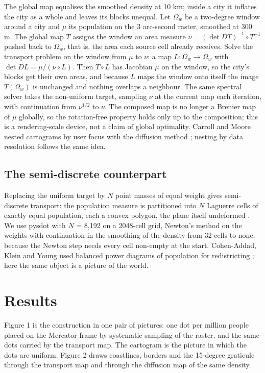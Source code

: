 The global map equalises the smoothed density at 10 km; inside a city it
inflates the city as a whole and leaves its blocks unequal. Let
\(\Omega_w\) be a two-degree window around a city and \(\mu\) its
population on the 3 arc-second raster, smoothed at 300 m. The global map
\(T\) assigns the window an area measure
\(\nu = (\det DT)^{-1}\circ T^{-1}\) pushed back to \(\Omega_w\), that
is, the area each source cell already receives. Solve the transport
problem on the window from \(\mu\) to \(\nu\): a map
\(L:\Omega_w\to\Omega_w\) with \(\det DL = \mu/(\nu\circ L)\). Then
\(T\circ L\) has Jacobian \(\mu\) on the window, so the city's blocks
get their own areas, and because \(L\) maps the window onto itself the
image \(T(\Omega_w)\) is unchanged and nothing overlaps a neighbour. The
same spectral solver takes the non-uniform target, sampling \(\nu\) at
the current map each iteration, with continuation from \(\nu^{1/2}\) to
\(\nu\). The composed map is no longer a Brenier map of \(\mu\)
globally, so the rotation-free property holds only up to the
composition; this is a rendering-scale device, not a claim of global
optimality. Carroll and Moore nested cartograms by user focus with the
diffusion method \citep{carroll2008}; nesting by data resolution follows the
same idea.

\subsection{The semi-discrete
counterpart}\label{the-semi-discrete-counterpart}

Replacing the uniform target by \(N\) point masses of equal weight gives
semi-discrete transport: the population measure is partitioned into
\(N\) Laguerre cells of exactly equal population, each a convex polygon,
the plane itself undeformed \citep{merigot2011}. We use pysdot \citep{pysdot}
with \(N\) = 8,192 on a 2048-cell grid, Newton's method on the weights
with continuation in the smoothing of the density from 32 cells to none,
because the Newton step needs every cell non-empty at the start.
Cohen-Addad, Klein and Young used balanced power diagrams of population
for redistricting \citep{cohenaddad2018}; here the same object is a picture of the
world.

\section{Results}\label{results}

Figure 1 is the construction in one pair of pictures: one dot per
million people placed on the Mercator frame by systematic sampling of
the raster, and the same dots carried by the transport map. The
cartogram is the picture in which the dots are uniform. Figure 2 draws
coastlines, borders and the 15-degree graticule through the transport
map and through the diffusion map of the same density.

